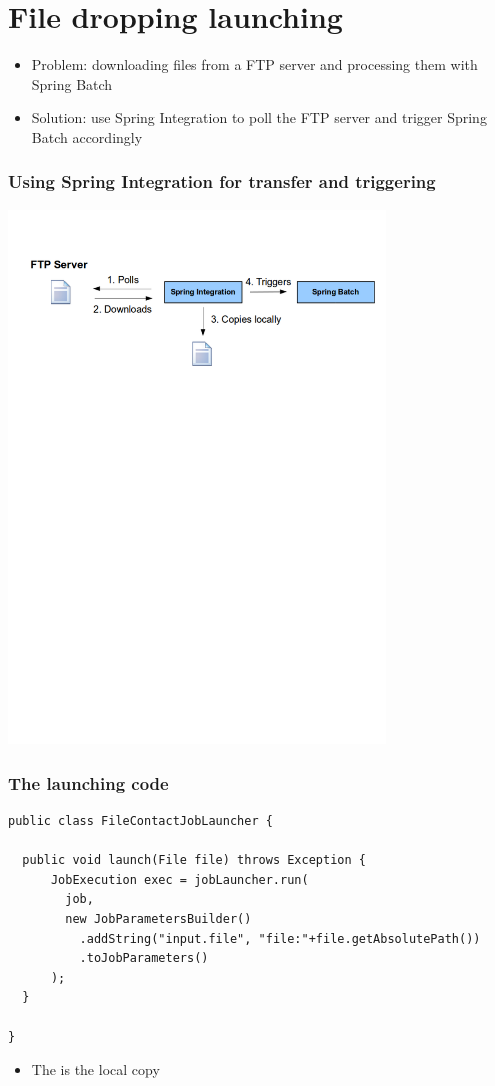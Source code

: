 \section{File dropping launching}

\begin{frame}
 \begin{itemize}
  \item Problem: downloading files from a FTP server and processing them with Spring Batch
  \item Solution: use Spring Integration to poll the FTP server and trigger Spring Batch accordingly
 \end{itemize}
\end{frame}

\begin{frame}
 \frametitle{Using Spring Integration for transfer and triggering}
 \begin{center}
  \includegraphics[width=10cm]{figures/spring-integration-ftp-poller.pdf}
 \end{center}
\end{frame}


\begin{frame}[fragile]
 \frametitle{The launching code}
 \lstset{language=Java}
 \begin{lstlisting}
public class FileContactJobLauncher {

  public void launch(File file) throws Exception {
      JobExecution exec = jobLauncher.run(
        job, 
        new JobParametersBuilder()
          .addString("input.file", "file:"+file.getAbsolutePath())
          .toJobParameters()
      );
  }

}  
 \end{lstlisting}

 \begin{itemize}
  \item The  is the local copy
 \end{itemize}
\end{frame}


